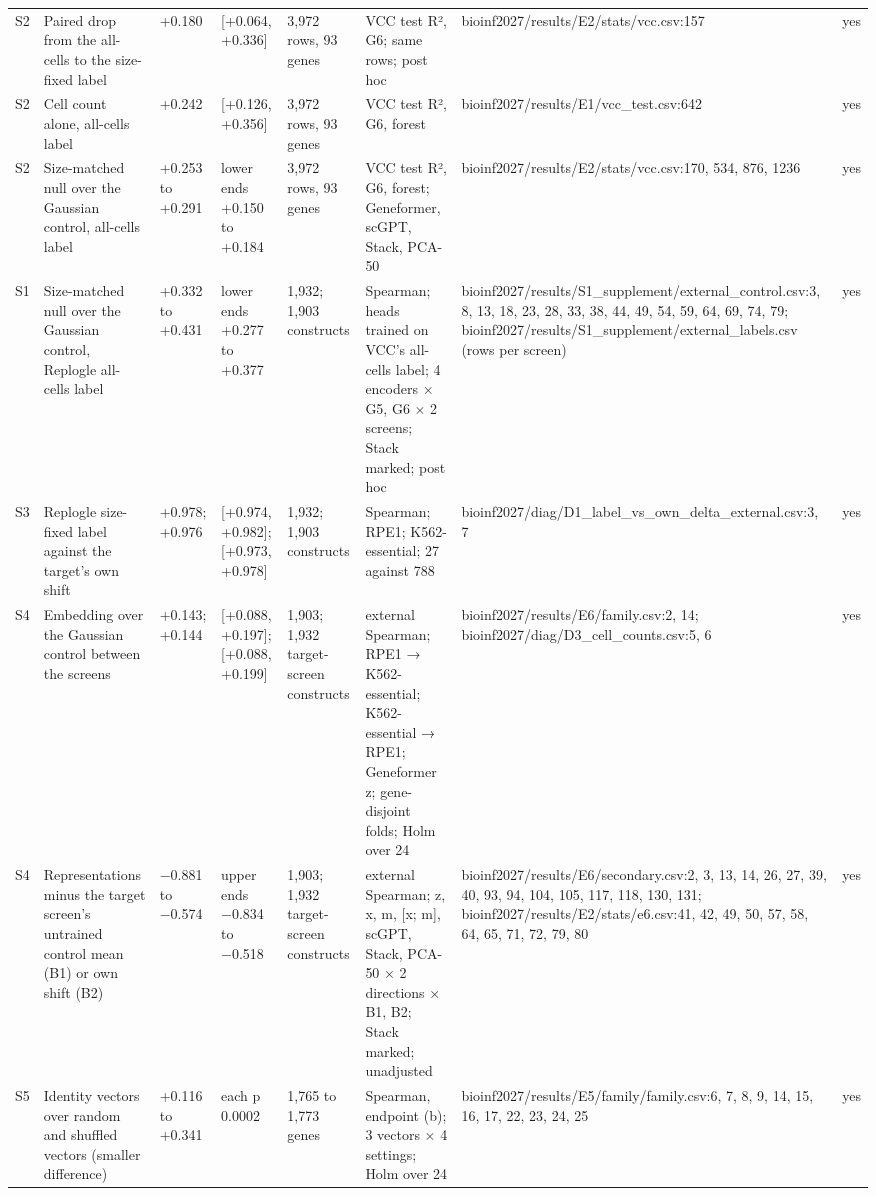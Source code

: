 \begin{tabular}{llllllll}
S2 & Paired drop from the all-cells to the size-fixed label & +0.180 & [+0.064, +0.336] & 3,972 rows, 93 genes & VCC test R², G6; same rows; post hoc & bioinf2027/results/E2/stats/vcc.csv:157 & yes \\
S2 & Cell count alone, all-cells label & +0.242 & [+0.126, +0.356] & 3,972 rows, 93 genes & VCC test R², G6, forest & bioinf2027/results/E1/vcc\_test.csv:642 & yes \\
S2 & Size-matched null over the Gaussian control, all-cells label & +0.253 to +0.291 & lower ends +0.150 to +0.184 & 3,972 rows, 93 genes & VCC test R², G6, forest; Geneformer, scGPT, Stack, PCA-50 & bioinf2027/results/E2/stats/vcc.csv:170, 534, 876, 1236 & yes \\
S1 & Size-matched null over the Gaussian control, Replogle all-cells label & +0.332 to +0.431 & lower ends +0.277 to +0.377 & 1,932; 1,903 constructs & Spearman; heads trained on VCC's all-cells label; 4 encoders × G5, G6 × 2 screens; Stack marked; post hoc & bioinf2027/results/S1\_supplement/external\_control.csv:3, 8, 13, 18, 23, 28, 33, 38, 44, 49, 54, 59, 64, 69, 74, 79; bioinf2027/results/S1\_supplement/external\_labels.csv (rows per screen) & yes \\
S3 & Replogle size-fixed label against the target's own shift & +0.978; +0.976 & [+0.974, +0.982]; [+0.973, +0.978] & 1,932; 1,903 constructs & Spearman; RPE1; K562-essential; 27 against 788 & bioinf2027/diag/D1\_label\_vs\_own\_delta\_external.csv:3, 7 & yes \\
S4 & Embedding over the Gaussian control between the screens & +0.143; +0.144 & [+0.088, +0.197]; [+0.088, +0.199] & 1,903; 1,932 target-screen constructs & external Spearman; RPE1 → K562-essential; K562-essential → RPE1; Geneformer z; gene-disjoint folds; Holm over 24 & bioinf2027/results/E6/family.csv:2, 14; bioinf2027/diag/D3\_cell\_counts.csv:5, 6 & yes \\
S4 & Representations minus the target screen's untrained control mean (B1) or own shift (B2) & −0.881 to −0.574 & upper ends −0.834 to −0.518 & 1,903; 1,932 target-screen constructs & external Spearman; z, x, m, [x; m], scGPT, Stack, PCA-50 × 2 directions × B1, B2; Stack marked; unadjusted & bioinf2027/results/E6/secondary.csv:2, 3, 13, 14, 26, 27, 39, 40, 93, 94, 104, 105, 117, 118, 130, 131; bioinf2027/results/E2/stats/e6.csv:41, 42, 49, 50, 57, 58, 64, 65, 71, 72, 79, 80 & yes \\
S5 & Identity vectors over random and shuffled vectors (smaller difference) & +0.116 to +0.341 & each p 0.0002 & 1,765 to 1,773 genes & Spearman, endpoint (b); 3 vectors × 4 settings; Holm over 24 & bioinf2027/results/E5/family/family.csv:6, 7, 8, 9, 14, 15, 16, 17, 22, 23, 24, 25 & yes \\

\end{tabular}
